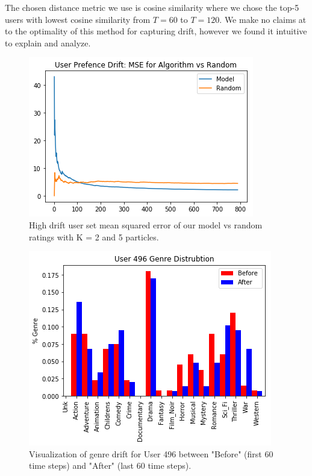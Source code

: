\documentclass{article}
\begin{document}
The chosen distance metric we use is cosine similarity where we chose the top-5 users with lowest cosine similarity from $T=60$ to $T=120$. We make no claims at to the optimality of this method for capturing drift, however we found it intuitive to explain and analyze. 

\begin{figure}[ht]

\begin{center}
\centerline{\includegraphics[width=\columnwidth]{drift_MSE}}
\caption{High drift user set mean squared error of our model vs random ratings with K = 2 and 5 particles.}
\label{drift_MSE}
\end{center}

\vskip -0.2in
\end{figure}

\begin{figure}[ht]

\begin{center}
\centerline{\includegraphics[width=\columnwidth]{drift_histogram}}
\caption{Visualization of genre drift for User 496 between "Before" (first 60 time steps) and "After" (last 60 time steps).}
\label{drift_histogram}
\end{center}

\vskip -0.2in
\end{figure}
\end{document}
